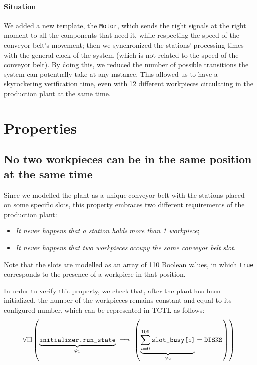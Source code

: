 \documentclass[a4paper,twoside]{article}
\newcommand{\formulacomment}[2]{\underset{\varphi_{#1}}{\underbrace{#2}}}
\newcommand{\formulatext}[1]{\text{\texttt{#1}}}
\begin{document}
    \paragraph{Situation} We added a new template, the \texttt{Motor}, which sends the right signals at the right moment to all the components that need it, while respecting the speed of the conveyor belt's movement; then we synchronized the stations' processing times with the general clock of the system (which is not related to the speed of the conveyor belt). By doing this, we reduced the number of possible transitions the system can potentially take at any instance. This allowed us to have a skyrocketing verification time, even with 12 different workpieces circulating in the production plant at the same time.

    \section{P\lowercase{roperties}}

    \subsection{No two workpieces can be in the same position at the same time} \label{property:1-2}

    Since we modelled the plant as a unique conveyor belt with the stations placed on some specific slots, this property embraces two different requirements of the production plant:
    \begin{itemize}
        \item \textit{It never happens that a station holds more than 1 workpiece};
        \item \textit{It never happens that two workpieces occupy the same conveyor belt slot}.
    \end{itemize}

    Note that the slots are modelled as an array of 110 Boolean values, in which \texttt{true} corresponds to the presence of a workpiece in that position.\medskip

    In order to verify this property, we check that, after the plant has been initialized, the number of the workpieces remains constant and equal to its configured number, which can be represented in TCTL as follows:
    \[\forall \square \left(\formulacomment{1}{\formulatext{initializer.run\_state}} \implies \left(\formulacomment{2}{\sum_{i = 0}^{109} \formulatext{slot\_busy[i]}} = \formulatext{DISKS}\right)\right)\]
\end{document}
